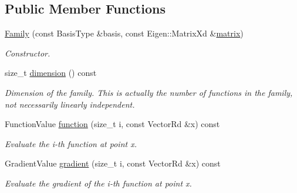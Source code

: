 \subsection*{Public Member Functions}
\begin{DoxyCompactItemize}
\item 
\hyperlink{classHArDCore2D_1_1Family_a2e8f09ecc2cfd226ebb6539b34934d6a}{Family} (const Basis\+Type \&basis, const Eigen\+::\+Matrix\+Xd \&\hyperlink{classHArDCore2D_1_1Family_aaf8f501609f30a03b0b167e381f6ac23}{matrix})
\begin{DoxyCompactList}\small\item\em Constructor. \end{DoxyCompactList}\item 
\mbox{\label{classHArDCore2D_1_1Family_a385bf99cf8c3888a150ed53f410ae39f}} 
size\+\_\+t \hyperlink{classHArDCore2D_1_1Family_a385bf99cf8c3888a150ed53f410ae39f}{dimension} () const
\begin{DoxyCompactList}\small\item\em Dimension of the family. This is actually the number of functions in the family, not necessarily linearly independent. \end{DoxyCompactList}\item 
\mbox{\label{classHArDCore2D_1_1Family_a15a1f56b9bb54f849ebaf4a66f75907d}} 
Function\+Value \hyperlink{classHArDCore2D_1_1Family_a15a1f56b9bb54f849ebaf4a66f75907d}{function} (size\+\_\+t i, const Vector\+Rd \&x) const
\begin{DoxyCompactList}\small\item\em Evaluate the i-\/th function at point x. \end{DoxyCompactList}\item 
\mbox{\label{classHArDCore2D_1_1Family_a05b9845ad5b44a743ae7e8223a897447}} 
Gradient\+Value \hyperlink{classHArDCore2D_1_1Family_a05b9845ad5b44a743ae7e8223a897447}{gradient} (size\+\_\+t i, const Vector\+Rd \&x) const
\begin{DoxyCompactList}\small\item\em Evaluate the gradient of the i-\/th function at point x. \end{DoxyCompactList}\item 
\mbox{\label{classHArDCore2D_1_1Family_a9f44b487b46df0e9cf83b175ae0ae3b3}} 

\end{DoxyCompactItemize}
